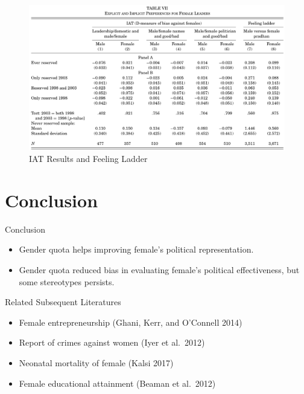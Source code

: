 \documentclass[
  10pt,
  ignorenonframetext,
  aspectratio=43,
]{beamer}
\providecommand{\tightlist}{%
  \setlength{\itemsep}{0pt}\setlength{\parskip}{0pt}}
\begin{document}
\begin{frame}
\begin{figure}
\centering
\includegraphics{20220523-qje-beaman-duflo-powerful-women.assets/table7-IAT results.png}
\caption{IAT Results and Feeling Ladder}
\end{figure}
\end{frame}

\hypertarget{conclusion}{%
\section{Conclusion}\label{conclusion}}

\begin{frame}{Conclusion}
\begin{itemize}
\tightlist
\item
  Gender quota helps improving female's political representation.
\item
  Gender quota reduced bias in evaluating female's political
  effectiveness, but some stereotypes persists.
\end{itemize}

\begin{block}{Related Subsequent Literatures}
\protect\hypertarget{related-subsequent-literatures}{}
\begin{itemize}
\tightlist
\item
  Female entrepreneurship \footnotesize (Ghani, Kerr, and O'Connell
  2014) \normalsize
\item
  Report of crimes against women \footnotesize (Iyer et al.~2012)
  \normalsize
\item
  Neonatal mortality of female \footnotesize (Kalsi 2017) \normalsize
\item
  Female educational attainment \footnotesize (Beaman et al.~2012)
  \normalsize
\end{itemize}
\end{block}

\begin{block}{}
\protect\hypertarget{section}{}
\end{block}
\end{frame}
\end{document}
